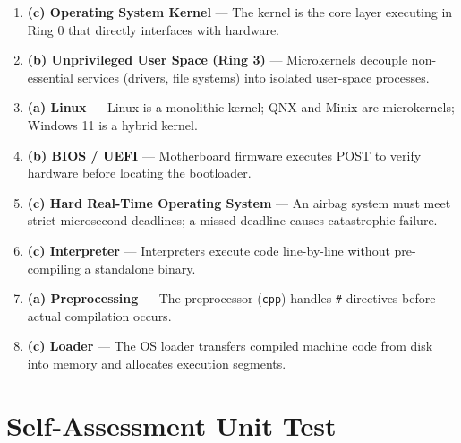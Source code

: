 \begin{solutionbox}
\begin{enumerate}
    \item \textbf{(c) Operating System Kernel} --- The kernel is the core layer executing in Ring 0 that directly interfaces with hardware.
    \item \textbf{(b) Unprivileged User Space (Ring 3)} --- Microkernels decouple non-essential services (drivers, file systems) into isolated user-space processes.
    \item \textbf{(a) Linux} --- Linux is a monolithic kernel; QNX and Minix are microkernels; Windows 11 is a hybrid kernel.
    \item \textbf{(b) BIOS / UEFI} --- Motherboard firmware executes POST to verify hardware before locating the bootloader.
    \item \textbf{(c) Hard Real-Time Operating System} --- An airbag system must meet strict microsecond deadlines; a missed deadline causes catastrophic failure.
    \item \textbf{(c) Interpreter} --- Interpreters execute code line-by-line without pre-compiling a standalone binary.
    \item \textbf{(a) Preprocessing} --- The preprocessor (\texttt{cpp}) handles \texttt{\#} directives before actual compilation occurs.
    \item \textbf{(c) Loader} --- The OS loader transfers compiled machine code from disk into memory and allocates execution segments.
\end{enumerate}
\end{solutionbox}

\section{Self-Assessment Unit Test}


